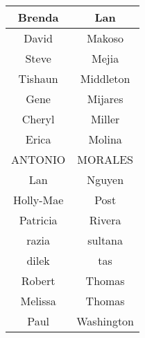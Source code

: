\documentclass[12pt,dvipsnames]{article}
\begin{document}
\begin{table}
\begin{tabular}{|c|c|}
		\hline
		Brenda & Lan\\ 
		\hline
		David & Makoso\\ 
		\hline
		Steve & Mejia\\ 
		\hline
		Tishaun & Middleton\\ 
		\hline
		Gene & Mijares\\ 
		\hline
		Cheryl & Miller\\ 
		\hline
		Erica & Molina\\ 
		\hline
		ANTONIO & MORALES\\ 
		\hline
		Lan & Nguyen\\ 
		\hline
		Holly-Mae  & Post\\ 
		\hline
		Patricia & Rivera\\ 
		\hline
		razia & sultana\\ 
		\hline
		dilek & tas\\ 
		\hline
		Robert & Thomas\\ 
		\hline
		Melissa & Thomas\\ 
		\hline
		Paul & Washington\\ 
		\hline\end{tabular}
\end{table}

\end{document}
